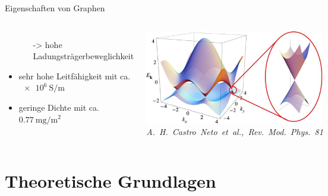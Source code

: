 \documentclass[aspectratio=1610, 9pt]{beamer}
\begin{document}
\begin{frame}{Eigenschaften von Graphen}
\begin{columns}
\begin{itemize}
    \begin{itemize}
      \item[->] hohe Ladungsträgerbeweglichkeit 
    \end{itemize}
    \item sehr hohe Leitfähigkeit mit ca. $ \qty{e6}{\siemens\per\metre}$
    \item geringe Dichte mit ca. $ \qty{0.77}{\milli\gram\per\metre\squared}$
    \end{itemize} 
    \vspace*{0.3cm}
    \centering
      \includegraphics[width=\textwidth]{Plots/dirac_cones.png}
      \hspace*{15pt}\hbox{\scriptsize {\small\itshape A. H. Castro Neto et al., \textit{Rev. Mod. Phys.} 81}}
  \end{columns}
\end{frame}

\section{Theoretische Grundlagen}
\end{document}
